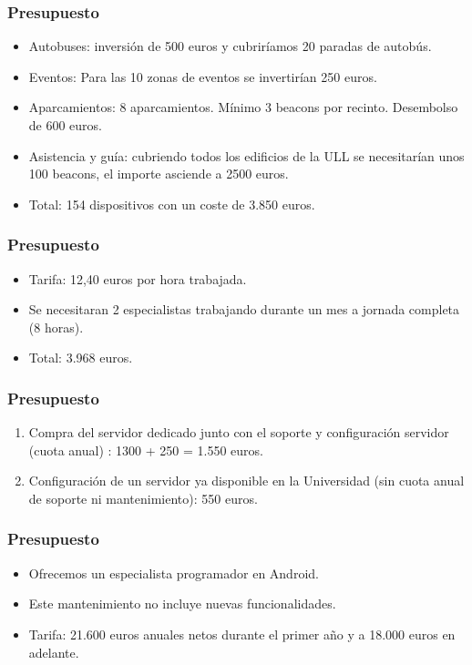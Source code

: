 \begin{frame}
	\frametitle{Presupuesto}
		\begin{itemize}
			\item Autobuses: inversión de 500 euros y cubriríamos 20 paradas de autobús.
			\item Eventos: Para las 10 zonas de eventos se invertirían 250 euros.
			\item Aparcamientos: 8 aparcamientos. Mínimo 3 beacons por recinto. Desembolso de 600 euros.
			\item Asistencia y guía: cubriendo todos los edificios de la ULL se necesitarían unos 100 beacons, el importe asciende a 2500 euros.
			\item Total: 154 dispositivos con un coste de 3.850 euros.
		\end{itemize}
	\endblock{}
\end{frame}


\begin{frame}
	\frametitle{Presupuesto}
		\begin{itemize}
			\item Tarifa: 12,40 euros por hora trabajada.
			\item Se necesitaran 2 especialistas trabajando durante un mes a jornada completa (8 horas). 
			\item Total: 3.968 euros.
		\end{itemize}
	\endblock{}
\end{frame}


\begin{frame}
	\frametitle{Presupuesto}
		\begin{enumerate}
			\item Compra del servidor dedicado junto con el soporte y configuración servidor (cuota anual) : 1300 + 250 = 1.550 euros.
			\item Configuración de un servidor ya disponible en la Universidad (sin cuota anual de soporte ni mantenimiento): 550 euros.
		\end{enumerate}
	\endblock{}
\end{frame}


\begin{frame}
	\frametitle{Presupuesto}
		\begin{itemize}
			\item Ofrecemos un especialista programador en Android.
			\item Este mantenimiento no incluye nuevas funcionalidades.
			\item Tarifa: 21.600 euros anuales netos durante el primer año y a 18.000 euros en adelante.
		\end{itemize}
	\endblock{}
\end{frame}